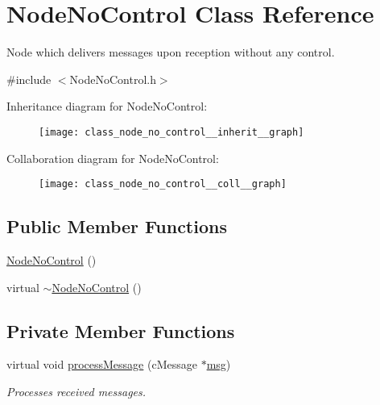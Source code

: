 \hypertarget{class_node_no_control}{}\section{Node\+No\+Control Class Reference}
\label{class_node_no_control}


Node which delivers messages upon reception without any control.  




{\ttfamily \#include $<$Node\+No\+Control.\+h$>$}



Inheritance diagram for Node\+No\+Control\+:
\nopagebreak
\begin{figure}[H]
\begin{center}
\leavevmode
\texttt{[image: class\_node\_no\_control\_\_inherit\_\_graph]}
\end{center}
\end{figure}


Collaboration diagram for Node\+No\+Control\+:
\nopagebreak
\begin{figure}[H]
\begin{center}
\leavevmode
\texttt{[image: class\_node\_no\_control\_\_coll\_\_graph]}
\end{center}
\end{figure}
\subsection*{Public Member Functions}
\begin{DoxyCompactItemize}
\item 
\hyperlink{class_node_no_control_ae48bd313edf922a104d690959f232822}{Node\+No\+Control} ()
\item 
virtual \hyperlink{class_node_no_control_a186d700d000404aa55658dd732e6ef4b}{$\sim$\+Node\+No\+Control} ()
\end{DoxyCompactItemize}
\subsection*{Private Member Functions}
\begin{DoxyCompactItemize}
\item 
virtual void \hyperlink{class_node_no_control_aa83bc408fe3dab03f124ea5489946836}{process\+Message} (c\+Message $\ast$\hyperlink{_controller_8h_afa0f3b802fbc219228f7bb97996fa558}{msg})
\begin{DoxyCompactList}\small\item\em Processes received messages. \end{DoxyCompactList}\end{DoxyCompactItemize}
